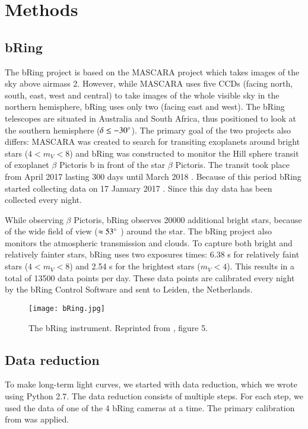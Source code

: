 \documentclass{aa}
\begin{document}
\section{Methods}
\label{sec:methods}
\subsection{bRing}
The bRing project is based on the MASCARA project \citep{mascara} which takes images of the sky above airmass 2. However, while MASCARA uses five CCDs (facing north, south, east, west and central) to take images of the whole visible sky in the northern hemisphere, bRing uses only two (facing east and west). The bRing telescopes are situated in Australia and South Africa, thus positioned to look at the southern hemisphere ($\delta \leq -30 ^\circ $). The primary goal of the two projects also differs: MASCARA was created to search for transiting exoplanets around bright stars ($4 < m_V < 8$) and bRing was constructed to monitor the Hill sphere transit of exoplanet $\beta$ Pictoris b in front of the star $\beta$ Pictoris. The transit took place from April 2017 lasting 300 days until March 2018 \citep{Wang_2016}. Because of this period bRing started collecting data on 17 January 2017 \citep{bring}. Since this day data has been collected every night.

While observing $\beta$ Pictoris, bRing observes 20000 additional bright stars, because of the wide field of view ($\approx 53^\circ$ ) around the star. The bRing project also monitors the atmospheric transmission and clouds. To capture both bright and relatively fainter stars, bRing uses two exposures times: 6.38 s for relatively faint stars ($4 < m_V < 8$) and 2.54 s for the brightest stars ($m_V < 4$). This results in a total of 13500 data points per day. These data points are calibrated every night by the bRing Control Software and sent to Leiden, the Netherlands.

\begin{figure}
    \centering
    \texttt{[image: bRing.jpg]}
    \caption{The bRing instrument. Reprinted from \cite{bring}, figure 5.}
    \label{bRing}
\end{figure}


\subsection{Data reduction}
To make long-term light curves, we started with data reduction, which we wrote using Python 2.7.
The data reduction consists of multiple steps. For each step, we used the data of one of the 4 bRing cameras at a time. The primary calibration from \cite{Talens_2018} was applied.
\end{document}
